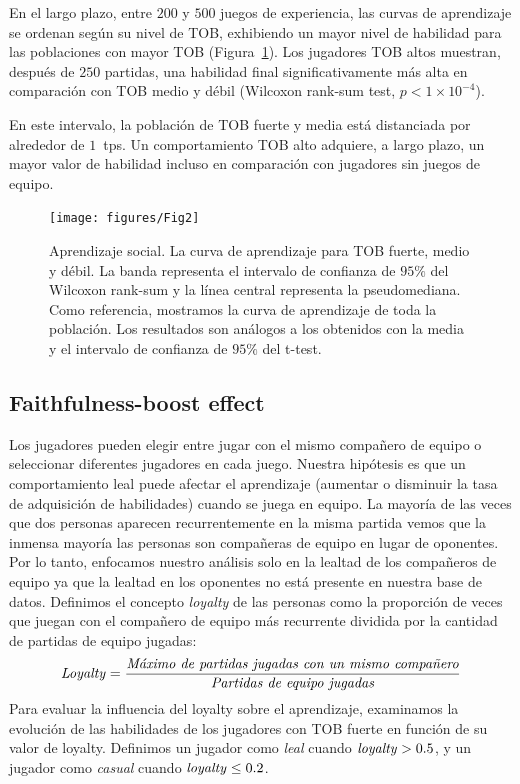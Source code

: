 \documentclass[a4paper,11pt]{book}
\theoremstyle{definition}
\begin{document}

En el largo plazo, entre $200$ y $500$ juegos de experiencia, las curvas de aprendizaje se ordenan seg\'un su nivel de TOB, exhibiendo un mayor nivel de habilidad para las poblaciones con mayor TOB (Figura~\ref{learningskill_team_hasta4team}).
%
Los jugadores TOB altos muestran, despu\'es de $250$ partidas, una habilidad final significativamente m\'as alta en comparaci\'on con TOB medio y d\'ebil (Wilcoxon rank-sum test, $p<1 \times10^{-4}$).


En este intervalo, la poblaci\'on de TOB fuerte y media est\'a distanciada por alrededor de $1$~tps.
%
Un comportamiento TOB alto adquiere, a largo plazo, un mayor valor de habilidad incluso en comparaci\'on con jugadores sin juegos de equipo.


\begin{figure}[ht!]
\centering
\texttt{[image: figures/Fig2]}
\caption{
Aprendizaje social.
%
La curva de aprendizaje para TOB fuerte, medio y d\'ebil.
%
La banda representa el intervalo de confianza de $95\%$ del Wilcoxon rank-sum y la l\'inea central representa la pseudomediana.
%
Como referencia, mostramos la curva de aprendizaje de toda la poblaci\'on.
%
Los resultados son an\'alogos a los obtenidos con la media y el intervalo de confianza de $95\%$ del t-test.
}
\label{learningskill_team_hasta4team}
\end{figure}


\subsection{Faithfulness-boost effect}

Los jugadores pueden elegir entre jugar con el mismo compa\~nero de equipo o seleccionar diferentes jugadores en cada juego.
%
Nuestra hip\'otesis es que un comportamiento leal puede afectar el aprendizaje (aumentar o disminuir la tasa de adquisici\'on de habilidades) cuando se juega en equipo.
%
La mayor\'ia de las veces que dos personas aparecen recurrentemente en la misma partida vemos que la inmensa mayor\'ia las personas son compa\~neras de equipo en lugar de oponentes.
%
Por lo tanto, enfocamos nuestro an\'alisis solo en la lealtad de los compa\~neros de equipo ya que la lealtad en los oponentes no est\'a presente en nuestra base de datos.
%
Definimos el concepto \emph{loyalty} de las personas como la proporci\'on de veces que juegan con el compa\~nero de equipo m\'as recurrente dividida por la cantidad de partidas de equipo jugadas:
%
\begin{equation}
\text{\emph{Loyalty}} = \frac{\text{\emph{M\'aximo de partidas jugadas con un mismo compa\~nero}}}{\text{\emph{Partidas de equipo jugadas}}}
\end{equation}
%
Para evaluar la influencia del loyalty sobre el aprendizaje, examinamos la evoluci\'on de las habilidades de los jugadores con TOB fuerte en funci\'on de su valor de loyalty.
%
Definimos un jugador como \emph{leal} cuando $\text{\emph{loyalty}}>0.5$, y un jugador como \emph{casual} cuando $\text{\emph{loyalty}}\leq 0.2$.
\end{document}

